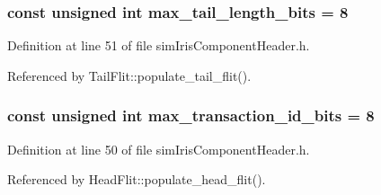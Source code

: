\subsubsection[{max\_\-tail\_\-length\_\-bits}]{\setlength{\rightskip}{0pt plus 5cm}const unsigned int {\bf max\_\-tail\_\-length\_\-bits} = 8}\label{simIrisComponentHeader_8h_5865e4b460e585b9a53f2dfa6a5839ae}




Definition at line 51 of file simIrisComponentHeader.h.

Referenced by TailFlit::populate\_\-tail\_\-flit().
\subsubsection[{max\_\-transaction\_\-id\_\-bits}]{\setlength{\rightskip}{0pt plus 5cm}const unsigned int {\bf max\_\-transaction\_\-id\_\-bits} = 8}\label{simIrisComponentHeader_8h_df297dfc5bd1387de6bec325bfa30f23}




Definition at line 50 of file simIrisComponentHeader.h.

Referenced by HeadFlit::populate\_\-head\_\-flit().